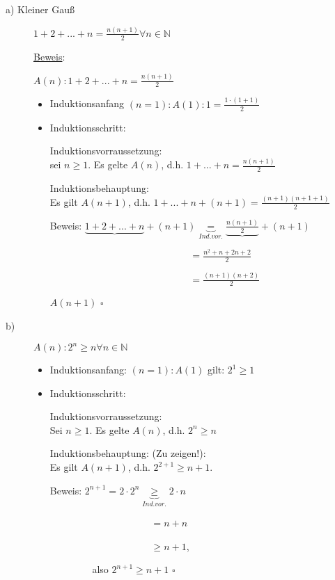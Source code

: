 \documentclass[a4paper, 12pt, twoside] {article}
\begin{document}
\begin{description}

\item[a) Kleiner Gauß]
$1 + 2 + ... + n = \frac{n(n+1)}{2} \forall n \in \mathbb{N}$

\underline{Beweis}:

$A(n) : 1 + 2 + ... + n = \frac{n(n+1)}{2}$

\begin{itemize}
\item Induktionsanfang $(n = 1): A(1): 1 = \frac{1 \cdot (1+1)}{2}$
\item Induktionsschritt:

Induktionsvorraussetzung: \\
sei $n \geq 1$. Es gelte $A(n)$, d.h. $1+ ... +n = \frac{n(n+1)}{2}$

Induktionsbehauptung: \\
Es gilt $A(n+1)$, d.h. $1+ ... +n + (n+1) = \frac{(n+1) (n+1 + 1)}{2}$

Beweis: $\underbrace{1 + 2 + ... + n}_{} + (n+1) \underbrace{=}_{Ind.vor.} \underbrace{\frac{n(n+1)}{2}} + (n+1)$

$\qquad\qquad\qquad\qquad\qquad\qquad\qquad$ \space
$ = \frac{n^2 + n + 2n + 2}{2}$

$\qquad\qquad\qquad\qquad\qquad\qquad\qquad$ \space
$=\frac{(n+1)(n+2)}{2}$

$A(n+1)$ \hfill $\square$

\end{itemize}

\item[b)]

$A(n): 2^n \geq n \forall n \in \mathbb{N}$
\begin{itemize}
\item Induktionsanfang: $(n = 1 ) : A(1)$ gilt: $2^1 \geq 1$
\item Induktionsschritt:

Induktionsvorraussetzung: \\
Sei $n \geq 1$. Es gelte $A(n)$, d.h. $2^n \geq n$

Induktionsbehauptung: (Zu zeigen!): \\
Es gilt $A(n+1)$, d.h. $2^{2+1} \geq n+1$.

Beweis: $2^{n+1} = 2 \cdot 2^n \underbrace{\geq}_{Ind.vor.} 2  \cdot  n$

$\qquad\qquad\qquad\qquad\qquad$
$= n + n$

$\qquad\qquad\qquad\qquad\qquad$
$\geq n + 1$,

$\qquad\qquad$
also \qquad $2^{n+1} \geq n+1$ \hfill $\square$
\end{itemize}

\end{description}
\end{document}
